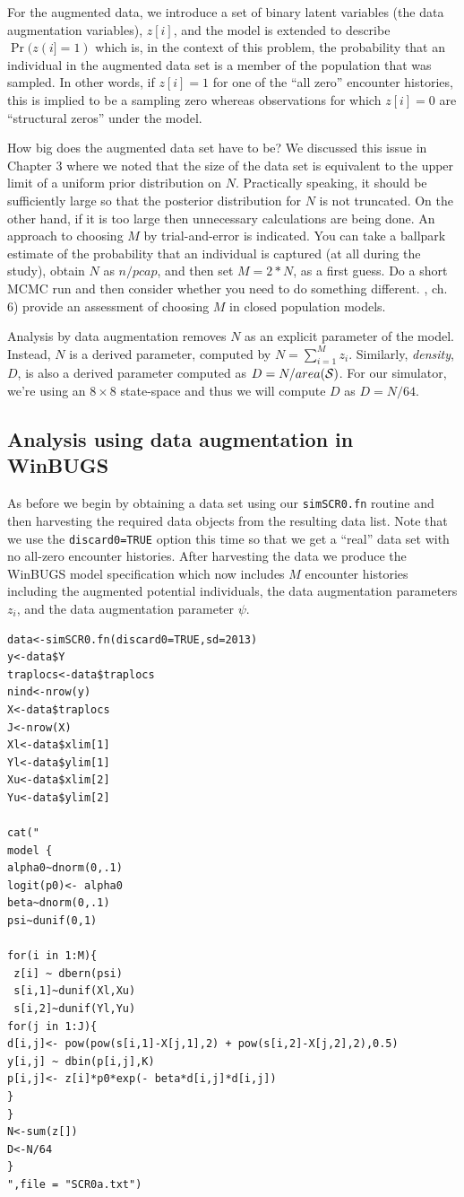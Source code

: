 For the augmented data, we introduce a set of binary latent variables (the data augmentation variables), $z[i]$, and the model is extended to describe $\Pr(z(i] = 1)$ which is, in the context of this problem, the probability that an individual in the augmented data set is a member of the population that was sampled. In other words, if $z[i]=1$ for one of the ``all zero'' encounter histories, this is implied to be a sampling zero whereas observations for which $z[i]=0$ are ``structural zeros'' under the model. 

How big does the augmented data set have to be? We discussed this
issue in Chapter 3 where we noted that the size of the data set is
equivalent to the upper limit of a uniform prior distribution on $N$.
Practically speaking, it should be sufficiently large so that the
posterior distribution for $N$ is not truncated. On the other hand, if
it is too large then unnecessary calculations are being done. An
approach to choosing $M$ by trial-and-error is indicated. You can take
a ballpark estimate of the probability that an individual is captured
(at all during the study), obtain $N$ as $n/pcap$, and then set $M =
2*N$, as a first guess. Do a short MCMC run and then consider whether
you need to do something different. \citet{kery_schaub:2011}, ch. 6) provide an assessment of choosing $M$ in closed population models. 

Analysis by data augmentation removes $N$ as an explicit parameter of the model. Instead, $N$ is a derived parameter, computed by $N= \sum_{i=1}^{M} z_{i}$. Similarly, {\it density}, $D$, is also a derived parameter computed as $D=N/area({\cal S})$. For our simulator, we're using an $8 \times 8$ state-space and thus we will compute $D$ as $D=N/64$.

\subsection{Analysis using data augmentation in WinBUGS}
As before we begin by obtaining a data set using our \mbox{\tt simSCR0.fn} routine and then harvesting the required data objects from the resulting data list.  Note that we use the \mbox{\tt discard0=TRUE} option this time so that we get a ``real'' data set with no all-zero encounter histories. After harvesting the data we produce the WinBUGS model specification which now includes $M$ encounter histories including the augmented potential individuals, the data augmentation parameters $z_{i}$, and the data augmentation parameter $\psi$.
\begin{verbatim}
data<-simSCR0.fn(discard0=TRUE,sd=2013)
y<-data$Y
traplocs<-data$traplocs
nind<-nrow(y)
X<-data$traplocs
J<-nrow(X)
Xl<-data$xlim[1]
Yl<-data$ylim[1]
Xu<-data$xlim[2]
Yu<-data$ylim[2]

cat("
model {
alpha0~dnorm(0,.1)
logit(p0)<- alpha0
beta~dnorm(0,.1)
psi~dunif(0,1)

for(i in 1:M){
 z[i] ~ dbern(psi)
 s[i,1]~dunif(Xl,Xu)
 s[i,2]~dunif(Yl,Yu) 
for(j in 1:J){
d[i,j]<- pow(pow(s[i,1]-X[j,1],2) + pow(s[i,2]-X[j,2],2),0.5)
y[i,j] ~ dbin(p[i,j],K)
p[i,j]<- z[i]*p0*exp(- beta*d[i,j]*d[i,j])
}
}
N<-sum(z[])
D<-N/64
}
",file = "SCR0a.txt")
\end{verbatim}

